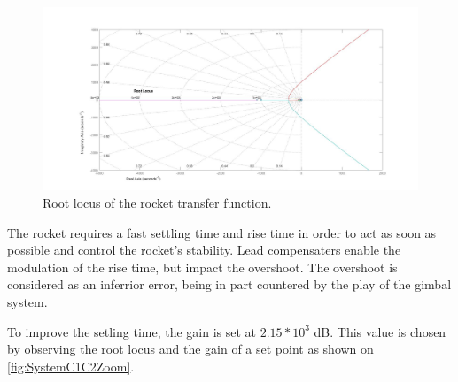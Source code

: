 \begin{figure}[htbp]
	\centering
	
		\includegraphics[width=\textwidth]{figures/Rocket/design/tf_with_controller_1}
		\caption{Root locus of the rocket transfer function.}
		\label{fig:SystemC1C2}
		
\end{figure}

The rocket requires a fast settling time and rise time in order to act as soon as possible and control the rocket's stability. Lead compensaters enable the modulation of the rise time, but impact the overshoot. The overshoot is considered as an inferrior error, being in part countered by the play of the gimbal system. 

To improve the setling time, the gain is set at $2.15 * 10^3$ \si{\dB}. This value is chosen by observing the root locus and the gain of a set point as shown on \autoref{fig:SystemC1C2Zoom}.

